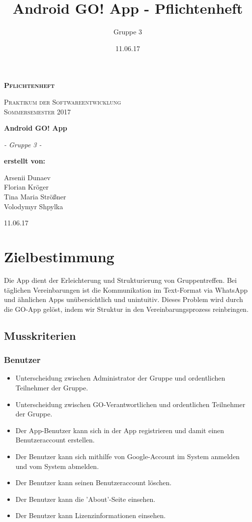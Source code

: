 \documentclass[parskip=full]{scrartcl}
\title{Android GO! App - Pflichtenheft}
\author{Gruppe 3}
\date{11.06.17}
\begin{document}
\begin{titlepage}
	\begin{center}
	{\scshape\LARGE \bfseries Pflichtenheft \par}
	\vspace{1cm}
	{\scshape\Large Praktikum der Softwareentwicklung \\ Sommersemester 2017\par}
	\vspace{1.5cm}
	{\huge\bfseries Android GO! App\par}
	\vspace{2cm}
	{\Large\itshape - Gruppe 3 -\par}
	\vfill
	{\bfseries erstellt von:\par}
	Arsenii Dunaev \\
	Florian Kröger \\
	Tina Maria Strößner \\
	Volodymyr Shpylka \\	
	\vfill
	{\large 11.06.17 \par}	
	\end{center}
\end{titlepage}

\tableofcontents

\newpage
\section{Zielbestimmung}
Die \gls{App} dient der Erleichterung und Strukturierung von Gruppentreffen. 
 Bei täglichen Vereinbarungen ist die Kommunikation im Text-Format via WhatsApp und ähnlichen Apps unübersichtlich und unintuitiv. 
Dieses Problem wird durch die GO-App gelöst, indem wir Struktur in den Vereinbarungsprozess reinbringen.  
\subsection{Musskriterien}

\subsubsection*{Benutzer}
	\begin{itemize}
		\item Unterscheidung zwischen Administrator der Gruppe und ordentlichen Teilnehmer der Gruppe.
		\item Unterscheidung zwischen GO-Verantwortlichen und ordentlichen Teilnehmer der Gruppe.
	 	\item Der App-Benutzer kann sich in der App registrieren und damit einen Benutzeraccount erstellen.
	 	\item Der Benutzer kann sich mithilfe von Google-Account im \gls{System} anmelden und vom System abmelden.
	 	\item Der Benutzer kann seinen Benutzeraccount löschen.
	 	\item Der Benutzer kann die 'About'-Seite einsehen.
	 	\item Der Benutzer kann Lizenzinformationen einsehen.
	\end{itemize} 
	
\end{document}
